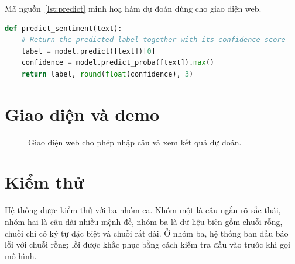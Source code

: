 Mã nguồn~\ref{lst:predict} minh hoạ hàm dự đoán dùng cho giao diện web.

\begin{lstlisting}[language=Python, caption={Hàm dự đoán cảm xúc cho một câu.}, label={lst:predict}]
def predict_sentiment(text):
    # Return the predicted label together with its confidence score
    label = model.predict([text])[0]
    confidence = model.predict_proba([text]).max()
    return label, round(float(confidence), 3)
\end{lstlisting}

\section{Giao diện và demo}

\begin{chuy}
\end{chuy}

\begin{figure}[H]
\centering
\caption{Giao diện web cho phép nhập câu và xem kết quả dự đoán.}
\label{fig:demo}
\end{figure}

\section{Kiểm thử}

\begin{chuy}
\end{chuy}

\begin{mau}
Hệ thống được kiểm thử với ba nhóm ca. Nhóm một là câu ngắn rõ sắc thái,
nhóm hai là câu dài nhiều mệnh đề, nhóm ba là dữ liệu biên gồm chuỗi rỗng,
chuỗi chỉ có ký tự đặc biệt và chuỗi rất dài. Ở nhóm ba, hệ thống ban đầu
báo lỗi với chuỗi rỗng; lỗi được khắc phục bằng cách kiểm tra đầu vào trước
khi gọi mô hình.
\end{mau}
